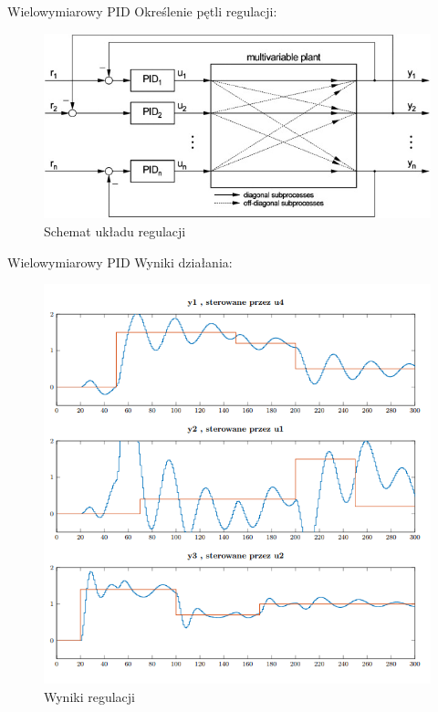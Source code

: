 \begin{frame}{Wielowymiarowy PID}
Określenie pętli regulacji:
	\begin{center}
		\begin{figure}[H]
            		\includegraphics[scale=0.7]{images/MPID.jpg}
          			 \caption{Schemat układu regulacji}
		\end{figure}
	\end{center}
\end{frame}

\begin{frame}{Wielowymiarowy PID}
Wyniki działania:
	\begin{center}
		\begin{figure}[H]
            		\includegraphics[scale=0.4]{images/MIMO_PID.png} %
          			 \caption{Wyniki regulacji}
		\end{figure}
	\end{center}
\end{frame}

